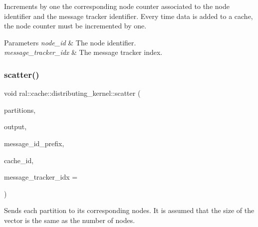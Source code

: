 Increments by one the corresponding node counter associated to the node identifier and the message tracker identifier. Every time data is added to a cache, the node counter must be incremented by one. 


\begin{DoxyParams}{Parameters}
{\em node\+\_\+id} & The node identifier. \\
\hline
{\em message\+\_\+tracker\+\_\+idx} & The message tracker index. \\
\hline
\end{DoxyParams}
\mbox{\label{classral_1_1cache_1_1distributing__kernel_ae2f86983ba3baca3a1f37ad7a6fc9326}} 
\subsubsection{\texorpdfstring{scatter()}{scatter()}}
{\footnotesize\ttfamily void ral\+::cache\+::distributing\+\_\+kernel\+::scatter (\begin{DoxyParamCaption}\item[{std\+::vector$<$ \hyperlink{classral_1_1frame_1_1BlazingTableView}{ral\+::frame\+::\+Blazing\+Table\+View} $>$}]{partitions,  }\item[{\hyperlink{classral_1_1cache_1_1CacheMachine}{ral\+::cache\+::\+Cache\+Machine} $\ast$}]{output,  }\item[{std\+::string}]{message\+\_\+id\+\_\+prefix,  }\item[{std\+::string}]{cache\+\_\+id,  }\item[{std\+::size\+\_\+t}]{message\+\_\+tracker\+\_\+idx = {} }\end{DoxyParamCaption})}



Sends each partition to its corresponding nodes. It is assumed that the size of the vector is the same as the number of nodes. 


